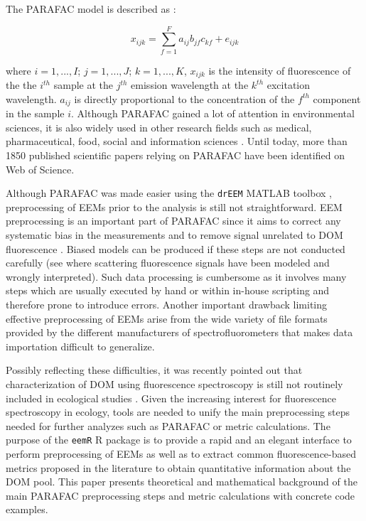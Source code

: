 \documentclass[]{book}
\theoremstyle{definition}
\theoremstyle{definition}
\theoremstyle{remark}
\begin{document}
The PARAFAC model is described as \citep{Bro1997, Harshman1970}:

\begin{equation}
x_{ijk} = \sum_{f=1}^{F} a_{ij}b_{jf}c_{kf} + e_{ijk}
\end{equation}

where \(i = 1, ..., I\); \(j = 1, ..., J\); \(k = 1, ..., K\),
\(x_{ijk}\) is the intensity of fluorescence of the the \(i^{th}\)
sample at the \(j^{th}\) emission wavelength at the \(k^{th}\)
excitation wavelength. \(a_{ij}\) is directly proportional to the
concentration of the \(f^{th}\) component in the sample \(i\). Although
PARAFAC gained a lot of attention in environmental sciences, it is also
widely used in other research fields such as medical, pharmaceutical,
food, social and information sciences \citep{Murphy2013}. Until today,
more than 1850 published scientific papers relying on PARAFAC have been
identified on Web of Science.

Although PARAFAC was made easier using the \texttt{drEEM} MATLAB toolbox
\citep{Murphy2013}, preprocessing of EEMs prior to the analysis is still
not straightforward. EEM preprocessing is an important part of PARAFAC
since it aims to correct any systematic bias in the measurements and to
remove signal unrelated to DOM fluorescence \citep{Murphy2013}. Biased
models can be produced if these steps are not conducted carefully (see
\citet{Hiriart-Baer2008} where scattering fluorescence signals have been
modeled and wrongly interpreted). Such data processing is cumbersome as
it involves many steps \citep{Stedmon2008, Murphy2013} which are usually
executed by hand or within in-house scripting and therefore prone to
introduce errors. Another important drawback limiting effective
preprocessing of EEMs arise from the wide variety of file formats
provided by the different manufacturers of spectrofluorometers that
makes data importation difficult to generalize.

Possibly reflecting these difficulties, it was recently pointed out that
characterization of DOM using fluorescence spectroscopy is still not
routinely included in ecological studies \citep{Fellman2010}. Given the
increasing interest for fluorescence spectroscopy in ecology, tools are
needed to unify the main preprocessing steps needed for further analyzes
such as PARAFAC or metric calculations. The purpose of the \texttt{eemR}
R package is to provide a rapid and an elegant interface to perform
preprocessing of EEMs as well as to extract common fluorescence-based
metrics proposed in the literature to obtain quantitative information
about the DOM pool. This paper presents theoretical and mathematical
background of the main PARAFAC preprocessing steps and metric
calculations with concrete code examples.
\end{document}
